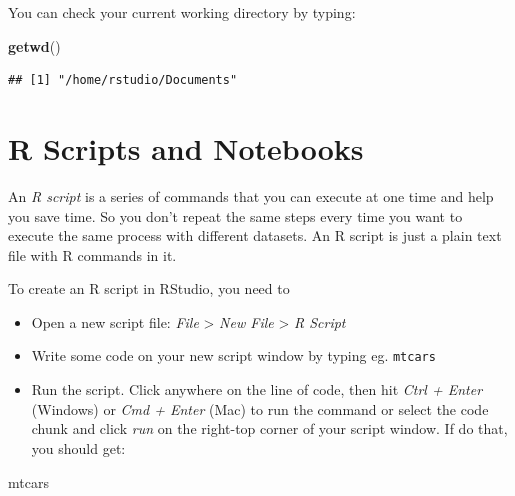 \documentclass[
]{book}
\newenvironment{Shaded}{\begin{snugshade}}{\end{snugshade}}
\newcommand{\KeywordTok}[1]{\textcolor[rgb]{0.13,0.29,0.53}{\textbf{#1}}}
\newcommand{\NormalTok}[1]{#1}
\begin{document}
You can check your current working directory by typing:

\begin{Shaded}
\begin{Highlighting}[]
\KeywordTok{getwd}\NormalTok{()}
\end{Highlighting}
\end{Shaded}

\begin{verbatim}
## [1] "/home/rstudio/Documents"
\end{verbatim}

\hypertarget{r-scripts-and-notebooks}{%
\section{R Scripts and Notebooks}\label{r-scripts-and-notebooks}}

An \emph{R script} is a series of commands that you can execute at one time and help you save time. So you don't repeat the same steps every time you want to execute the same process with different datasets. An R script is just a plain text file with R commands in it.

To create an R script in RStudio, you need to

\begin{itemize}
\item
  Open a new script file: \emph{File} \textgreater{} \emph{New File} \textgreater{} \emph{R Script}
\item
  Write some code on your new script window by typing eg. \texttt{mtcars}
\item
  Run the script. Click anywhere on the line of code, then hit \emph{Ctrl + Enter} (Windows) or \emph{Cmd + Enter} (Mac) to run the command or select the code chunk and click \emph{run} on the right-top corner of your script window. If do that, you should get:
\end{itemize}

\begin{Shaded}
\begin{Highlighting}[]
\NormalTok{mtcars}
\end{Highlighting}
\end{Shaded}
\end{document}
